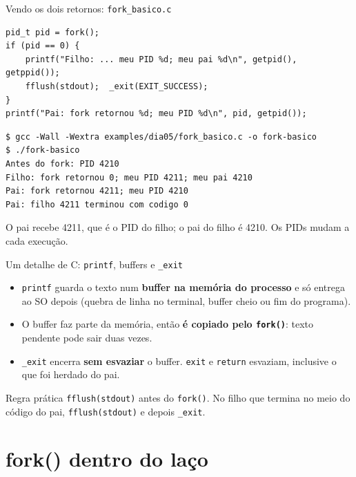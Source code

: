 \documentclass[aspectratio=169]{beamer}
\begin{document}
\begin{frame}[fragile]{Vendo os dois retornos: \texttt{fork\_basico.c}}
\begin{lstlisting}[style=codigo, basicstyle=\ttfamily\scriptsize\color{termfg}]
pid_t pid = fork();
if (pid == 0) {
    printf("Filho: ... meu PID %d; meu pai %d\n", getpid(), getppid());
    fflush(stdout);  _exit(EXIT_SUCCESS);
}
printf("Pai: fork retornou %d; meu PID %d\n", pid, getpid());
\end{lstlisting}

\begin{lstlisting}[style=terminal, basicstyle=\ttfamily\scriptsize\color{termfg}]
$ gcc -Wall -Wextra examples/dia05/fork_basico.c -o fork-basico
$ ./fork-basico
Antes do fork: PID 4210
Filho: fork retornou 0; meu PID 4211; meu pai 4210
Pai: fork retornou 4211; meu PID 4210
Pai: filho 4211 terminou com codigo 0
\end{lstlisting}

\small O pai recebe 4211, que é o PID do filho; o pai do filho é 4210. Os PIDs mudam a cada execução.
\end{frame}

\begin{frame}{Um detalhe de C: \texttt{printf}, buffers e \texttt{\_exit}}
\begin{itemize}
    \item \texttt{printf} guarda o texto num \textbf{buffer na memória do processo} e só entrega ao SO depois (quebra de linha no terminal, buffer cheio ou fim do programa).
    \item O buffer faz parte da memória, então \textbf{é copiado pelo \texttt{fork()}}: texto pendente pode sair duas vezes.
    \item \texttt{\_exit} encerra \textbf{sem esvaziar} o buffer. \texttt{exit} e \texttt{return} esvaziam, inclusive o que foi herdado do pai.
\end{itemize}

\vspace{0.5em}
\begin{alertblock}{Regra prática}
\texttt{fflush(stdout)} antes do \texttt{fork()}. No filho que termina no meio do código do pai, \texttt{fflush(stdout)} e depois \texttt{\_exit}.
\end{alertblock}
\end{frame}

\section{fork() dentro do laço}
\end{document}
